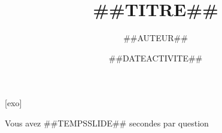 \documentclass[c]{beamer}
\title{##{{TITRE}}##}
\author{##{{AUTEUR}}##}
\institute{##{{ETABLISSEMENT}}##}
\date{##{{DATEACTIVITE}}##}
\newcounter{exo}
\begin{document}
[exo]
\renewcommand{\thenocalcul}{\Alph{nocalcul}}

\begin{frame}
	\titlepage
	\begin{center}
	Vous avez ##{{TEMPSSLIDE}}## secondes par question
	\end{center}
\end{frame}
\end{document}
